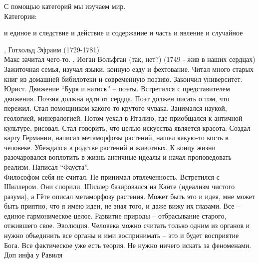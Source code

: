 \documentclass[a4paper,12pt]{report} %
\begin{document}
\begin{itemize}
  С помощью категорий мы изучаем мир.\\
  Категории:
  \begin{enumerate}
   и единое
   и следствие
   и действие
   и содержание
   и часть
   и явление
   и случайное
  \end{enumerate}
, Готхольд Эфраим (1729-1781)\\
Макс зачитал чего-то.
, Иоган Вольфган (так, нет?) (1749 - жив в наших сердцах)\\
Зажиточная семья, изучал языки, конную езду и фехтование. Читал много
старых книг из домашней бибилотеки и современную поэзию. Закончил
университет. Юрист. Движение ``Буря и натиск'' -- поэты. Встретился с
представителем движения. Поэзия должна идти от сердца. Поэт должен
писать о том, что пережил. Стал помощником какого-то крутого
чувака. Занимался наукой, геологией, минералогией. Потом уехал в
Италию, где приобщался к античной культуре, рисовал. Стал говорить,
что целью искусства является красота. Создал карту Германии, написал
метаморфозы растений, нашел какую-то кость в человеке. Убеждался в
родстве растений и животных. К концу жизни разочаровался воплотить в
жизнь античные идеалы и начал проповедовать реализм. Написал
``Фауста''.\\
Философом себя не считал. Не принимал отвлеченность. Встретился с
Шиллером. Они спорили. Шиллер базировался на Канте (идеализм чистого
разума), а Гёте описал метаморфозу растения. Может быть это и идея,
мне может быть приятно, что я имею идеи, не зная того, и даже вижу их
глазами. Все -- единое гармоническое целое. Развитие природы --
отбрасывание старого, отжившего свое. Эволюция. Человека можно считать
только одним из органов и нужно объединить все органы и ими
воспринимать -- это и будет восприятие Бога. Все фактическое уже есть
теория. Не нужно ничего искать за феноменами.
\\
Доп инфа у Равиля
\end{itemize}
\end{document}
